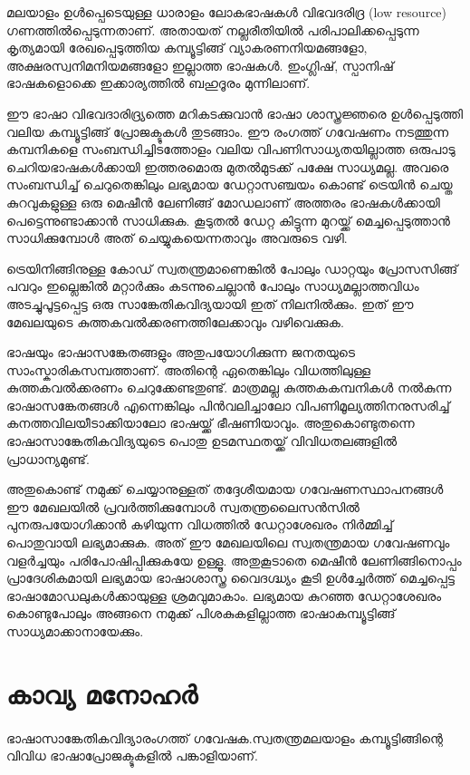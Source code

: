 \documentclass[12pt,twoside,a4paper]{article}
\begin{document}
മലയാളം ഉൾപ്പെടെയുള്ള ധാരാളം ലോകഭാഷകൾ വിഭവദരിദ്ര (low resource) ഗണത്തിൽപ്പെടുന്നതാണ്. അതായത് നല്ലരീതിയിൽ പരിപാലിക്കപ്പെടുന്ന കൃത്യമായി രേഖപ്പെടുത്തിയ കമ്പ്യൂട്ടിങ്ങ് വ്യാകരണനിയമങ്ങളോ, അക്ഷരസ്വനിമനിയമങ്ങളോ ഇല്ലാത്ത ഭാഷകൾ. ഇംഗ്ലിഷ്, സ്പാനിഷ് ഭാഷകളൊക്കെ ഇക്കാര്യത്തിൽ ബഹുദൂരം മുന്നിലാണ്.

ഈ ഭാഷാ വിഭവദാരിദ്ര്യത്തെ മറികടക്കുവാൻ ഭാഷാ ശാസ്ത്രജ്ഞരെ ഉൾപ്പെടുത്തി വലിയ കമ്പ്യൂട്ടിങ്ങ് പ്രോജക്ടുകൾ തുടങ്ങാം. ഈ രംഗത്ത് ഗവേഷണം നടത്തുന്ന കമ്പനികളെ സംബന്ധിച്ചിടത്തോളം വലിയ വിപണിസാധ്യതയില്ലാത്ത ഒരുപാടു ചെറിയഭാഷകൾക്കായി ഇത്തരമൊരു മുതൽമുടക്ക്  പക്ഷേ സാധ്യമല്ല. അവരെ സംബന്ധിച്ച് ചെറുതെങ്കിലും ലഭ്യമായ ഡേറ്റാസഞ്ചയം കൊണ്ട് ട്രെയിൻ ചെയ്ത കുറവുകളുള്ള ഒരു മെഷീൻ ലേണിങ്ങ്  മോഡലാണ് അത്തരം ഭാഷകൾക്കായി പെട്ടെന്നുണ്ടാക്കാൻ സാധിക്കുക. കൂടുതൽ ഡേറ്റ കിട്ടുന്ന മുറയ്ക്ക് മെച്ചപ്പെടുത്താൻ സാധിക്കുമ്പോൾ അത് ചെയ്യുകയെന്നതാവും അവരുടെ വഴി.

ട്രെയിനിങ്ങിനുള്ള കോഡ് സ്വതന്ത്രമാണെങ്കിൽ പോലും ഡാറ്റയും പ്രോസസിങ്ങ് പവറും ഇല്ലെങ്കിൽ മറ്റാർക്കും കടന്നുചെല്ലാൻ പോലും  സാധ്യമല്ലാത്തവിധം അടച്ചുപൂട്ടപ്പെട്ട ഒരു സാങ്കേതികവിദ്യയായി ഇത് നിലനിൽക്കും. ഇത് ഈ മേഖലയുടെ കുത്തകവൽക്കരണത്തിലേക്കാവും വഴിവെക്കുക.

ഭാഷയും ഭാഷാസങ്കേതങ്ങളും അതുപയോഗിക്കുന്ന ജനതയുടെ സാംസ്കാരികസമ്പത്താണ്. അതിന്റെ ഏതെങ്കിലും വിധത്തിലുള്ള കുത്തകവൽക്കരണം ചെറുക്കേണ്ടതുണ്ട്. മാത്രമല്ല കുത്തകകമ്പനികൾ നൽകുന്ന ഭാഷാസങ്കേതങ്ങൾ എന്നെങ്കിലും പിൻവലിച്ചാലോ വിപണിമൂല്യത്തിനനുസരിച്ച്  കനത്തവിലയീടാക്കിയാലോ ഭാഷയ്ക്ക് ഭീഷണിയാവും. അതുകൊണ്ടുതന്നെ ഭാഷാസാങ്കേതികവിദ്യയുടെ പൊതു ഉടമസ്ഥതയ്ക്ക് വിവിധതലങ്ങളിൽ പ്രാധാന്യമുണ്ട്.

അതുകൊണ്ട് നമുക്ക് ചെയ്യാനുള്ളത് തദ്ദേശീയമായ ഗവേഷണസ്ഥാപനങ്ങൾ ഈ മേഖലയിൽ പ്രവർത്തിക്കുമ്പോൾ സ്വതന്ത്രലൈസൻസിൽ പുനരുപയോഗിക്കാൻ കഴിയുന്ന വിധത്തിൽ ഡേറ്റാശേഖരം നിർമ്മിച്ച് 
പൊതുവായി ലഭ്യമാക്കുക.  അത് ഈ മേഖലയിലെ സ്വതന്ത്രമായ ഗവേഷണവും വളർച്ചയും പരിപോഷിപ്പിക്കുകയേ ഉള്ളൂ. അതുകൂടാതെ മെഷീൻ ലേണിങ്ങിനൊപ്പം പ്രാദേശികമായി ലഭ്യമായ ഭാഷാശാസ്ത്ര വൈദഗ്ദ്ധ്യം കൂടി ഉൾച്ചേർത്ത്  മെച്ചപ്പെട്ട ഭാഷാമോഡലുകൾക്കായുള്ള ശ്രമവുമാകാം. ലഭ്യമായ കുറഞ്ഞ ഡേറ്റാശേഖരം കൊണ്ടുപോലും  അങ്ങനെ നമുക്ക് പിശകുകളില്ലാത്ത ഭാഷാകമ്പ്യൂട്ടിങ്ങ് സാധ്യമാക്കാനായേക്കും.

\newpage

\section*{കാവ്യ മനോഹർ}
\paragraph{}
ഭാഷാസാങ്കേതികവിദ്യാരംഗത്ത് ഗവേഷക.സ്വതന്ത്രമലയാളം കമ്പ്യൂട്ടിങ്ങിന്റെ വിവിധ ഭാഷാപ്രോജക്ടുകളിൽ പങ്കാളിയാണ്. 
 
\end{document}
